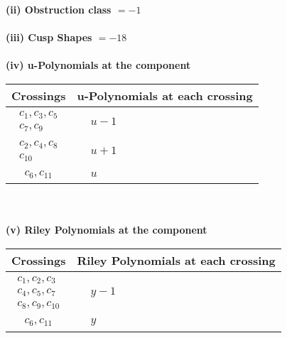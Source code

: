 \documentclass[1p]{elsarticle_modified}
\theoremstyle{definition}
\begin{document}
\flushleft \textbf{(ii) Obstruction class $= -1$}\\~\\
\flushleft \textbf{(iii) Cusp Shapes $= -18$}\\~\\
\newpage\renewcommand{\arraystretch}{1}
\flushleft \textbf{(iv) u-Polynomials at the component}\newline \\
\begin{tabular}{m{50pt}|m{274pt}}
Crossings & \hspace{64pt}u-Polynomials at each crossing \\
\hline $$\begin{aligned}c_{1},c_{3},c_{5}\\c_{7},c_{9}\end{aligned}$$&$\begin{aligned}
&u-1
\end{aligned}$\\
\hline $$\begin{aligned}c_{2},c_{4},c_{8}\\c_{10}\end{aligned}$$&$\begin{aligned}
&u+1
\end{aligned}$\\
\hline $$\begin{aligned}c_{6},c_{11}\end{aligned}$$&$\begin{aligned}
&u
\end{aligned}$\\
\hline
\end{tabular}\\~\\
\newpage\renewcommand{\arraystretch}{1}
\flushleft \textbf{(v) Riley Polynomials at the component}\newline \\
\begin{tabular}{m{50pt}|m{274pt}}
Crossings & \hspace{64pt}Riley Polynomials at each crossing \\
\hline $$\begin{aligned}c_{1},c_{2},c_{3}\\c_{4},c_{5},c_{7}\\c_{8},c_{9},c_{10}\end{aligned}$$&$\begin{aligned}
&y-1
\end{aligned}$\\
\hline $$\begin{aligned}c_{6},c_{11}\end{aligned}$$&$\begin{aligned}
&y
\end{aligned}$\\
\hline
\end{tabular}\\~\\
\end{document}
